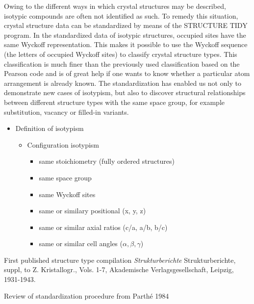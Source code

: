 \documentclass[11pt]{article}
\providecommand{\tightlist}{%
      \setlength{\itemsep}{0pt}\setlength{\parskip}{0pt}}
\begin{document}
Owing to the different ways in which crystal structures may be
described, isotypic compounds are often not identified as such. To
remedy this situation, crystal structure data can be standardized by
means of the STRUCTURE TIDY program. In the standardized data of
isotypic structures, occupied sites have the same Wyckoff
representation. This makes it possible to use the Wyckoff sequence (the
letters of occupied Wyckoff sites) to classify crystal structure types.
This classification is much finer than the previously used
classification based on the Pearson code and is of great help if one
wants to know whether a particular atom arrangement is already known.
The standardization has enabled us not only to demonstrate new cases of
isotypism, but also to discover structural relationships between
different structure types with the same space group, for example
substitution, vacancy or filled-in variants.

\begin{itemize}
\tightlist
\item
  Definition of isotypism

  \begin{itemize}
  \tightlist
  \item
    Configuration isotypism

    \begin{itemize}
    \tightlist
    \item
      same stoichiometry (fully ordered structures)
    \item
      same space group
    \item
      same Wyckoff sites
    \item
      same or similary positional (x, y, z)
    \item
      same or similar axial ratios (c/a, a/b, b/c)
    \item
      same or similar cell angles (\(\alpha, \beta, \gamma\))
    \end{itemize}
  \end{itemize}
\end{itemize}

First published structure type compilation \emph{Strukturberichte}
Strukturberichte, suppl, to Z. Kristallogr., Vols. 1-7, Akademische
Verlagsgesellschaft, Leipzig, 1931-1943.

Review of standardization procedure from Parthé 1984
\end{document}
